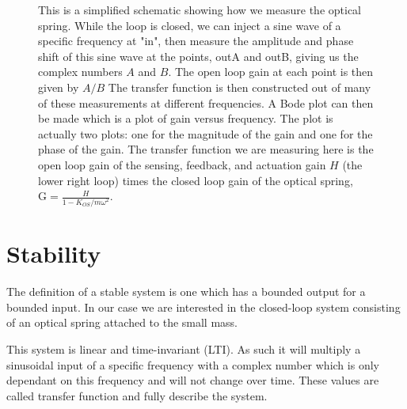 \begin{figure}
\caption[Open Loop Gain Measurement]{This is a simplified schematic showing how
  we measure the optical spring.
  While the loop is closed, we can inject a sine wave of a specific frequency
  at "in", then measure the amplitude and phase shift of this sine wave at the
  points, outA and outB, giving us the complex numbers $A$ and $B$.
  The open loop gain at each point is then given by $A/B$
  The transfer function is then constructed out of many of these measurements
  at different frequencies.
  A Bode plot can then be made which is a plot of gain versus frequency.
  The plot is actually two plots: one for the magnitude of the gain and one
  for the phase of the gain.
  The transfer function we are measuring here is the open loop gain of the
  sensing, feedback, and actuation gain $H$ (the lower right loop) times the
  closed loop gain of the optical spring,
  $\mathrm{G} = \frac{H}{1-K_{OS}/m\omega^2}$.
  }
\label{fig:results:servoloop}
\end{figure}

\section{Stability}

The definition of a stable system is one which has a bounded output for a
bounded input.
In our case we are interested in the closed-loop system consisting of an
optical spring attached to the small mass.

This system is linear and time-invariant
(LTI).
As such it will multiply a sinusoidal input
of a specific frequency with a complex number which is only dependant on this
frequency and will not change over time.
These values are called transfer function and fully describe the system.

